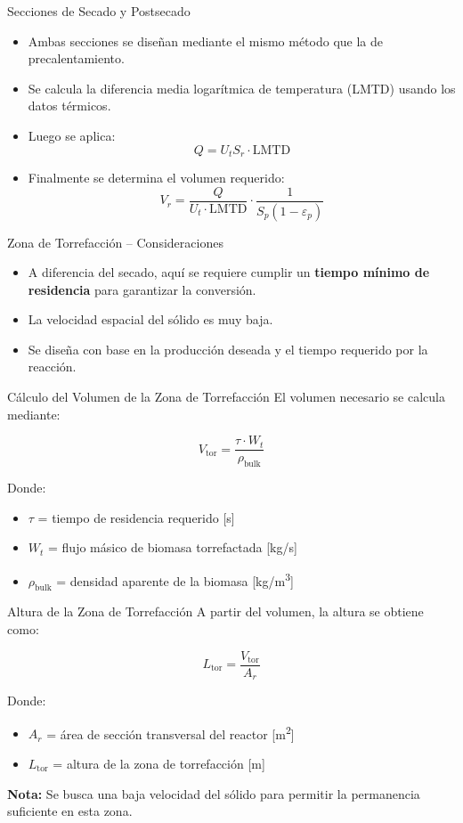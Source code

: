 \documentclass[main.tex]{subfiles}
\begin{document}
\begin{frame}{Secciones de Secado y Postsecado}
  \begin{itemize}
    \item Ambas secciones se diseñan mediante el mismo método que la de precalentamiento.
    \item Se calcula la diferencia media logarítmica de temperatura (LMTD) usando los datos térmicos.
    \item Luego se aplica:
    \[
      Q = U_t S_r \cdot \text{LMTD}
    \]
    \item Finalmente se determina el volumen requerido:
    \[
      V_r = \frac{Q}{U_t \cdot \text{LMTD}} \cdot \frac{1}{S_p (1 - \varepsilon_p)}
    \]
  \end{itemize}
\end{frame}


\begin{frame}{Zona de Torrefacción – Consideraciones}
  \begin{itemize}
    \item A diferencia del secado, aquí se requiere cumplir un \textbf{tiempo mínimo de residencia} para garantizar la conversión.
    \item La velocidad espacial del sólido es muy baja.
    \item Se diseña con base en la producción deseada y el tiempo requerido por la reacción.
  \end{itemize}
\end{frame}


\begin{frame}{Cálculo del Volumen de la Zona de Torrefacción}
  El volumen necesario se calcula mediante:

  \[
    V_{\text{tor}} = \frac{\tau \cdot W_t}{\rho_{\text{bulk}}}
  \]

  Donde:
  \begin{itemize}
    \item $\tau$ = tiempo de residencia requerido [s]
    \item $W_t$ = flujo másico de biomasa torrefactada [kg/s]
    \item $\rho_{\text{bulk}}$ = densidad aparente de la biomasa [kg/m\textsuperscript{3}]
  \end{itemize}
\end{frame}


\begin{frame}{Altura de la Zona de Torrefacción}
  A partir del volumen, la altura se obtiene como:

  \[
    L_{\text{tor}} = \frac{V_{\text{tor}}}{A_r}
  \]

  Donde:
  \begin{itemize}
    \item $A_r$ = área de sección transversal del reactor [m\textsuperscript{2}]
    \item $L_{\text{tor}}$ = altura de la zona de torrefacción [m]
  \end{itemize}

  \textbf{Nota:} Se busca una baja velocidad del sólido para permitir la permanencia suficiente en esta zona.
\end{frame}
\end{document}
